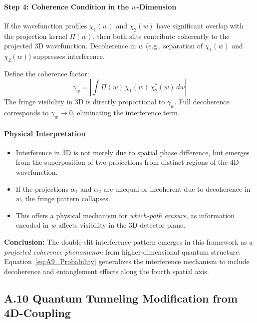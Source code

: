 \documentclass[12pt]{article}
\begin{document}
\paragraph{Step 4: Coherence Condition in the \(w\)-Dimension}

If the wavefunction profiles \(\chi_1(w)\) and \(\chi_2(w)\) have significant overlap with the projection kernel \(\Pi(w)\), then both slits contribute coherently to the projected 3D wavefunction. Decoherence in \(w\) (e.g., separation of \(\chi_1(w)\) and \(\chi_2(w)\)) suppresses interference.

Define the coherence factor:
\begin{equation}
\gamma_w = \left| \int \Pi(w)\, \chi_1(w)\, \chi_2^*(w)\, dw \right|
\end{equation}
The fringe visibility in 3D is directly proportional to \(\gamma_w\). Full decoherence corresponds to \(\gamma_w \to 0\), eliminating the interference term.

\paragraph{Physical Interpretation}

\begin{itemize}
  \item Interference in 3D is not merely due to spatial phase difference, but emerges from the superposition of two projections from distinct regions of the 4D wavefunction.
  \item If the projections \(\alpha_1\) and \(\alpha_2\) are unequal or incoherent due to decoherence in \(w\), the fringe pattern collapses.
  \item This offers a physical mechanism for \emph{which-path erasure}, as information encoded in \(w\) affects visibility in the 3D detector plane.
\end{itemize}

\textbf{Conclusion:}  
The double-slit interference pattern emerges in this framework as a \emph{projected coherence phenomenon} from higher-dimensional quantum structure. Equation~\eqref{eq:A9_Probability} generalizes the interference mechanism to include decoherence and entanglement effects along the fourth spatial axis.


\subsection*{A.10 \quad Quantum Tunneling Modification from 4D-Coupling}
\label{eq:A10}
\end{document}
